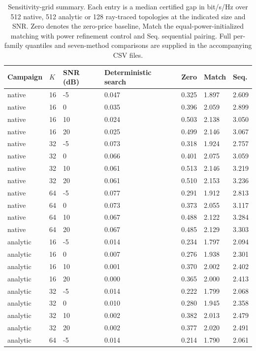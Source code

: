 \documentclass[10pt,letterpaper]{article}
\begin{document}
\begin{table}[htbp]\centering\small
\setlength{\tabcolsep}{3pt}
\caption{Sensitivity-grid summary. Each entry is a median certified gap in bit/s/Hz over 512 native, 512 analytic or 128 ray-traced topologies at the indicated size and SNR. Zero denotes the zero-price baseline, Match the equal-power-initialized matching with power refinement control and Seq. sequential pairing. Full per-family quantiles and seven-method comparisons are supplied in the accompanying CSV files.}\label{supp:table5}
\begin{tabular}{lllllll}\toprule
Campaign & $K$ & SNR (dB) & Deterministic search & Zero & Match & Seq.\\\midrule
native & 16 & -5 & 0.047 & 0.325 & 1.897 & 2.609\\
native & 16 & 0 & 0.035 & 0.396 & 2.059 & 2.899\\
native & 16 & 10 & 0.024 & 0.503 & 2.138 & 3.050\\
native & 16 & 20 & 0.025 & 0.499 & 2.146 & 3.067\\
native & 32 & -5 & 0.073 & 0.318 & 1.924 & 2.757\\
native & 32 & 0 & 0.066 & 0.401 & 2.075 & 3.059\\
native & 32 & 10 & 0.061 & 0.513 & 2.146 & 3.219\\
native & 32 & 20 & 0.061 & 0.510 & 2.153 & 3.236\\
native & 64 & -5 & 0.077 & 0.291 & 1.912 & 2.813\\
native & 64 & 0 & 0.073 & 0.373 & 2.055 & 3.117\\
native & 64 & 10 & 0.067 & 0.488 & 2.122 & 3.284\\
native & 64 & 20 & 0.067 & 0.485 & 2.129 & 3.303\\
analytic & 16 & -5 & 0.014 & 0.234 & 1.797 & 2.094\\
analytic & 16 & 0 & 0.007 & 0.276 & 1.938 & 2.301\\
analytic & 16 & 10 & 0.001 & 0.370 & 2.002 & 2.402\\
analytic & 16 & 20 & 0.000 & 0.365 & 2.000 & 2.413\\
analytic & 32 & -5 & 0.014 & 0.222 & 1.799 & 2.068\\
analytic & 32 & 0 & 0.010 & 0.280 & 1.945 & 2.358\\
analytic & 32 & 10 & 0.002 & 0.382 & 2.013 & 2.479\\
analytic & 32 & 20 & 0.002 & 0.377 & 2.020 & 2.491\\
analytic & 64 & -5 & 0.014 & 0.214 & 1.790 & 2.061\\

\end{tabular}
\end{table}
\end{document}

